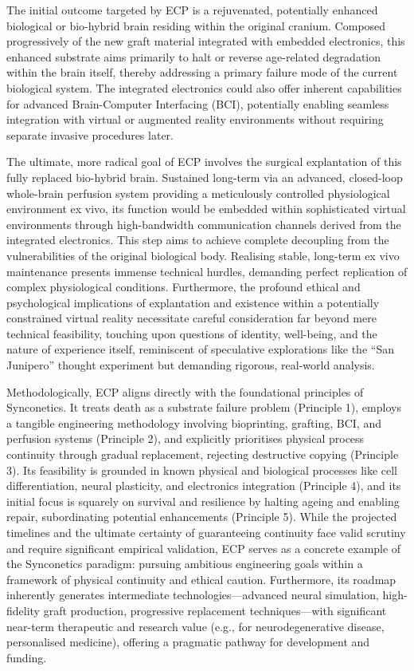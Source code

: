 \documentclass[10pt]{article}
\begin{document}
\begin{sloppypar}
  The initial outcome targeted by ECP is a rejuvenated, potentially enhanced biological or bio-hybrid brain residing within the original cranium. Composed progressively of the new graft material integrated with embedded electronics, this enhanced substrate aims primarily to halt or reverse age-related degradation within the brain itself, thereby addressing a primary failure mode of the current biological system. The integrated electronics could also offer inherent capabilities for advanced Brain-Computer Interfacing (BCI), potentially enabling seamless integration with virtual or augmented reality environments without requiring separate invasive procedures later.

  The ultimate, more radical goal of ECP involves the surgical explantation of this fully replaced bio-hybrid brain. Sustained long-term via an advanced, closed-loop whole-brain perfusion system providing a meticulously controlled physiological environment ex vivo, its function would be embedded within sophisticated virtual environments through high-bandwidth communication channels derived from the integrated electronics. This step aims to achieve complete decoupling from the vulnerabilities of the original biological body. Realising stable, long-term ex vivo maintenance presents immense technical hurdles, demanding perfect replication of complex physiological conditions. Furthermore, the profound ethical and psychological implications of explantation and existence within a potentially constrained virtual reality necessitate careful consideration far beyond mere technical feasibility, touching upon questions of identity, well-being, and the nature of experience itself, reminiscent of speculative explorations like the “San Junipero” thought experiment but demanding rigorous, real-world analysis.

  Methodologically, ECP aligns directly with the foundational principles of Synconetics. It treats death as a substrate failure problem (Principle 1), employs a tangible engineering methodology involving bioprinting, grafting, BCI, and perfusion systems (Principle 2), and explicitly prioritises physical process continuity through gradual replacement, rejecting destructive copying (Principle 3). Its feasibility is grounded in known physical and biological processes like cell differentiation, neural plasticity, and electronics integration (Principle 4), and its initial focus is squarely on survival and resilience by halting ageing and enabling repair, subordinating potential enhancements (Principle 5). While the projected timelines and the ultimate certainty of guaranteeing continuity face valid scrutiny and require significant empirical validation, ECP serves as a concrete example of the Synconetics paradigm: pursuing ambitious engineering goals within a framework of physical continuity and ethical caution. Furthermore, its roadmap inherently generates intermediate technologies—advanced neural simulation, high-fidelity graft production, progressive replacement techniques—with significant near-term therapeutic and research value (e.g., for neurodegenerative disease, personalised medicine), offering a pragmatic pathway for development and funding.


\end{sloppypar}
\end{document}

